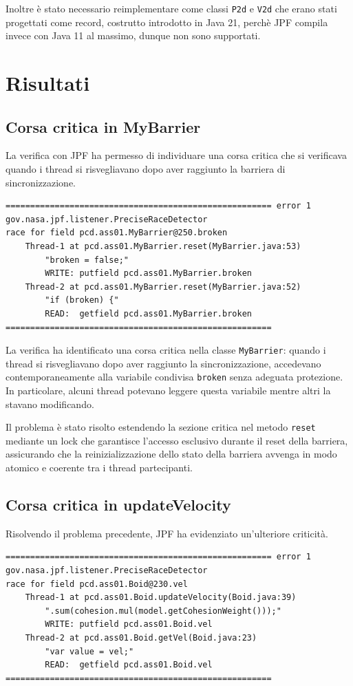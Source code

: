 \documentclass[a4paper,12pt]{report}
\begin{document}
Inoltre è stato necessario reimplementare come classi \texttt{P2d} e \texttt{V2d} che erano stati progettati come record, costrutto introdotto in Java 21, perchè JPF compila invece con Java 11 al massimo, dunque non sono supportati.

\section{Risultati}

\subsection{Corsa critica in MyBarrier}
La verifica con JPF ha permesso di individuare una corsa critica che si verificava quando i thread si risvegliavano dopo aver raggiunto la barriera di sincronizzazione.

\begin{verbatim}
====================================================== error 1
gov.nasa.jpf.listener.PreciseRaceDetector
race for field pcd.ass01.MyBarrier@250.broken
    Thread-1 at pcd.ass01.MyBarrier.reset(MyBarrier.java:53)
        "broken = false;"  
        WRITE: putfield pcd.ass01.MyBarrier.broken
    Thread-2 at pcd.ass01.MyBarrier.reset(MyBarrier.java:52)
        "if (broken) {"  
        READ:  getfield pcd.ass01.MyBarrier.broken
====================================================== 
\end{verbatim}

La verifica ha identificato una corsa critica nella classe \texttt{MyBarrier}: quando i thread si risvegliavano dopo aver raggiunto la sincronizzazione, accedevano contemporaneamente alla variabile condivisa \texttt{broken} senza adeguata protezione. In particolare, alcuni thread potevano leggere questa variabile mentre altri la stavano modificando.

Il problema è stato risolto estendendo la sezione critica nel metodo \texttt{reset} mediante un lock che garantisce l'accesso esclusivo durante il reset della barriera, assicurando che la reinizializzazione dello stato della barriera avvenga in modo atomico e coerente tra i thread partecipanti.

\subsection{Corsa critica in updateVelocity}
Risolvendo il problema precedente, JPF ha evidenziato un'ulteriore criticità.

\begin{verbatim}
====================================================== error 1
gov.nasa.jpf.listener.PreciseRaceDetector
race for field pcd.ass01.Boid@230.vel
    Thread-1 at pcd.ass01.Boid.updateVelocity(Boid.java:39)
        ".sum(cohesion.mul(model.getCohesionWeight()));"  
        WRITE: putfield pcd.ass01.Boid.vel
    Thread-2 at pcd.ass01.Boid.getVel(Boid.java:23)
        "var value = vel;"  
        READ:  getfield pcd.ass01.Boid.vel
======================================================
\end{verbatim}
\end{document}
